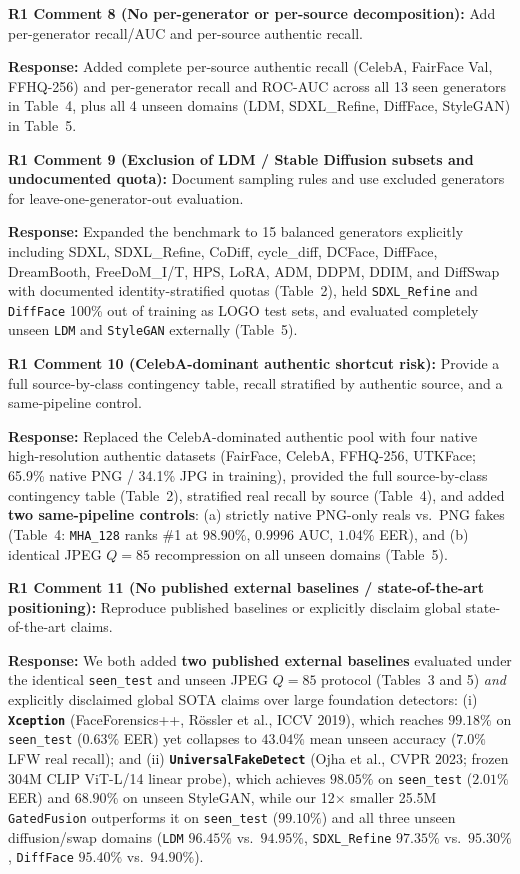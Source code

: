 \documentclass[11pt,a4paper]{article}
\newcommand{\reviewercomment}[2]{%
  \vspace{0.6em}\noindent\begin{tcolorbox}[colback=boxbg,colframe=revcolor,boxrule=0.6pt,left=6pt,right=6pt,top=4pt,bottom=4pt]
  \textbf{\color{revcolor}#1:} #2
  \end{tcolorbox}
}
\newcommand{\authorresponse}[1]{%
  \noindent\textbf{\color{respcolor}Response:} #1\par\vspace{0.5em}
}
\begin{document}
\reviewercomment{R1 Comment 8 (No per-generator or per-source decomposition)}{Add per-generator recall/AUC and per-source authentic recall.}
\authorresponse{Added complete per-source authentic recall (CelebA, FairFace Val, FFHQ-256) and per-generator recall and ROC-AUC across all 13 seen generators in Table~4, plus all 4 unseen domains (LDM, SDXL\_Refine, DiffFace, StyleGAN) in Table~5.}

\reviewercomment{R1 Comment 9 (Exclusion of LDM / Stable Diffusion subsets and undocumented quota)}{Document sampling rules and use excluded generators for leave-one-generator-out evaluation.}
\authorresponse{Expanded the benchmark to 15 balanced generators explicitly including SDXL, SDXL\_Refine, CoDiff, cycle\_diff, DCFace, DiffFace, DreamBooth, FreeDoM\_I/T, HPS, LoRA, ADM, DDPM, DDIM, and DiffSwap with documented identity-stratified quotas (Table~2), held \texttt{SDXL\_Refine} and \texttt{DiffFace} 100\% out of training as LOGO test sets, and evaluated completely unseen \texttt{LDM} and \texttt{StyleGAN} externally (Table~5).}

\reviewercomment{R1 Comment 10 (CelebA-dominant authentic shortcut risk)}{Provide a full source-by-class contingency table, recall stratified by authentic source, and a same-pipeline control.}
\authorresponse{Replaced the CelebA-dominated authentic pool with four native high-resolution authentic datasets (FairFace, CelebA, FFHQ-256, UTKFace; 65.9\% native PNG / 34.1\% JPG in training), provided the full source-by-class contingency table (Table~2), stratified real recall by source (Table~4), and added \textbf{two same-pipeline controls}: (a) strictly native PNG-only reals vs.\ PNG fakes (Table~4: \texttt{MHA\_128} ranks \#1 at $98.90\%$, $0.9996$ AUC, $1.04\%$ EER), and (b) identical JPEG $Q=85$ recompression on all unseen domains (Table~5).}

\reviewercomment{R1 Comment 11 (No published external baselines / state-of-the-art positioning)}{Reproduce published baselines or explicitly disclaim global state-of-the-art claims.}
\authorresponse{We both added \textbf{two published external baselines} evaluated under the identical \texttt{seen\_test} and unseen JPEG $Q=85$ protocol (Tables~3 and 5) \emph{and} explicitly disclaimed global SOTA claims over large foundation detectors: (i) \textbf{\texttt{Xception}} (FaceForensics++, R\"{o}ssler et al., ICCV 2019), which reaches $99.18\%$ on \texttt{seen\_test} ($0.63\%$ EER) yet collapses to $43.04\%$ mean unseen accuracy ($7.0\%$ LFW real recall); and (ii) \textbf{\texttt{UniversalFakeDetect}} (Ojha et al., CVPR 2023; frozen 304M CLIP ViT-L/14 linear probe), which achieves $98.05\%$ on \texttt{seen\_test} ($2.01\%$ EER) and $68.90\%$ on unseen StyleGAN, while our 12$\times$ smaller 25.5M \texttt{GatedFusion} outperforms it on \texttt{seen\_test} ($99.10\%$) and all three unseen diffusion/swap domains (\texttt{LDM} $96.45\%$ vs.\ $94.95\%$, \texttt{SDXL\_Refine} $97.35\%$ vs.\ $95.30\%$, \texttt{DiffFace} $95.40\%$ vs.\ $94.90\%$).}
\end{document}
